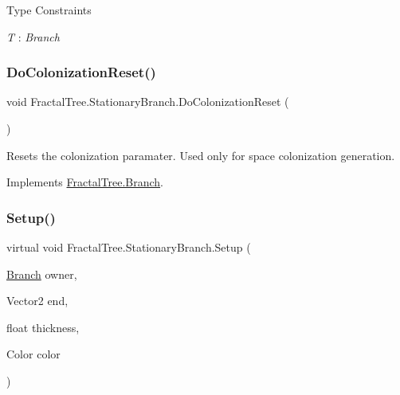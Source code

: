 \begin{Desc}
\item[Type Constraints]\begin{description}
\item[{\em T} : {\em Branch}]\end{description}
\end{Desc}
\mbox{\label{class_fractal_tree_1_1_stationary_branch_a57a5b1cbc9fd081c5b8cb41b61d24502}} 
\subsubsection{\texorpdfstring{Do\+Colonization\+Reset()}{DoColonizationReset()}}
{\footnotesize\ttfamily void Fractal\+Tree.\+Stationary\+Branch.\+Do\+Colonization\+Reset (\begin{DoxyParamCaption}{ }\end{DoxyParamCaption})}



Resets the colonization paramater. Used only for space colonization generation. 



Implements \hyperlink{interface_fractal_tree_1_1_branch_a4460379e72ec587f890b1e0cf77dbc3c}{Fractal\+Tree.\+Branch}.

\mbox{\label{class_fractal_tree_1_1_stationary_branch_acaa0bef74389db9f1a2f57af38557000}} 
\subsubsection{\texorpdfstring{Setup()}{Setup()}\hspace{0.1cm}{\footnotesize\ttfamily [1/4]}}
{\footnotesize\ttfamily virtual void Fractal\+Tree.\+Stationary\+Branch.\+Setup (\begin{DoxyParamCaption}\item[{\hyperlink{interface_fractal_tree_1_1_branch}{Branch}}]{owner,  }\item[{Vector2}]{end,  }\item[{float}]{thickness,  }\item[{Color}]{color }\end{DoxyParamCaption})\hspace{0.3cm}{\ttfamily [virtual]}}



